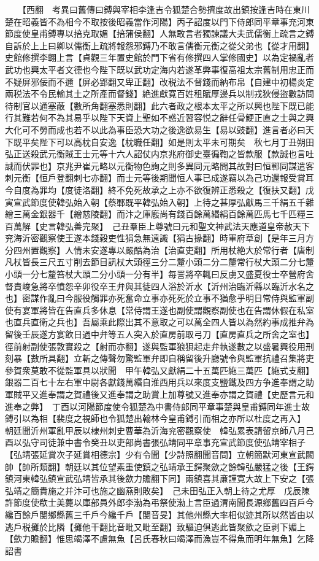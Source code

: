 　　【西翻　考異曰舊傳曰鎛與宰相李逢吉令狐楚合勢擠度故出鎮按逢吉時在東川楚在昭義皆不為相今不取按後昭義當作河陽】丙子詔度以門下侍郎同平章事充河東節度使皇甫鎛專以掊克取媚【掊蒲侯翻】人無敢言者獨諫議大夫武儒衡上疏言之鎛自訴於上上曰卿以儒衡上疏將報怨邪鎛乃不敢言儒衡元衡之從父弟也【從才用翻】　史館修撰李翺上言【貞觀三年置史館於門下省有修撰四人掌修國史】以為定禍亂者武功也興太平者文德也今陛下既以武功定海内若遂革弊事復高祖太宗舊制用忠正而不疑屏邪佞而不邇【屏必郢翻又卑正翻】改税法不督錢而納布帛【自建中初楊炎定兩税法不令民輸其土之所產而督錢】絶進獻寛百姓租賦厚邊兵以制戎狄侵盜數訪問待制官以通塞蔽【數所角翻塞悉則翻】此六者政之根本太平之所以興也陛下既已能行其難若何不為其易乎以陛下天資上聖如不惑近習容悦之辭任骨鯁正直之士與之興大化可不勞而成也若不以此為事臣恐大功之後逸欲易生【易以豉翻】進言者必曰天下既平矣陛下可以高枕自安逸【枕職任翻】如是則太平未可期矣　秋七月丁丑朔田弘正送殺武元衡賊王士元等十六人詔仗内京兆府御史臺徧鞫之皆款服【款誠也言吐誠而伏罪也】京兆尹崔元略以元衡物色詢之則多異同元略問其故對曰恒鄆同謀遣客刺元衡【恒戶登翻刺七亦翻】而士元等後期聞恒人事已成遂竊以為己功還報受賞耳今自度為罪均【度徒洛翻】終不免死故承之上亦不欲復辨正悉殺之【復扶又翻】戊寅宣武節度使韓弘始入朝【蔡鄆既平韓弘始入朝】上待之甚厚弘獻馬三千絹五千雜繒三萬金銀器千【繒慈陵翻】而汴之庫廏尚有錢百餘萬緡絹百餘萬匹馬七千匹糧三百萬解【史言韓弘善完聚】　己丑羣臣上尊號曰元和聖文神武法天應道皇帝赦天下兖海沂密觀察使王遂本錢穀吏性狷急無遠識【狷古掾翻】時軍府草創【是年三月方分四州置觀察】人情未安遂專以嚴酷為治【治直吏翻】所用杖絶大於常行者【唐制凡杖皆長三尺五寸削去節目訊杖大頭徑三分二釐小頭二分二釐常行杖大頭二分七釐小頭一分七釐笞杖大頭二分小頭一分有半】每詈將卒輒曰反虜又盛夏役士卒營府舍督責峻急將卒憤怨辛卯役卒王弁與其徒四人浴於沂水【沂州治臨沂縣以臨沂水名之也】密謀作亂曰今服役觸罪亦死奮命立事亦死死於立事不猶愈乎明日常侍與監軍副使有宴軍將皆在告直兵多休息【常侍謂王遂也副使謂觀察副使也在告謂休假在私室也直兵直衛之兵也】吾屬乘此際出其不意取之可以萬全四人皆以為然約事成推弁為留後壬辰遂方宴飲日過中弁等五人突入於直房前取弓刀【直房直兵之所舍之室也】徑前射副使張敦實殺之【射而亦翻】遂與監軍狼狽起走弁執遂數之以盛暑興役用刑刻暴【數所具翻】立斬之傳聲勿驚監軍弁即自稱留後升廳號令與監軍抗禮召集將吏參賀衆莫敢不從監軍具以狀聞　甲午韓弘又獻絹二十五萬匹絁三萬匹【絁式支翻】銀器二百七十左右軍中尉各獻錢萬緡自淮西用兵以來度支鹽鐵及四方争進奉謂之助軍賊平又進奉謂之賀禮後又進奉謂之助賞上加尊號又進奉亦謂之賀禮【史歷言元和進奉之弊】　丁酉以河陽節度使令狐楚為中書侍郎同平章事楚與皇甫鎛同年進士故鎛引以為相【裴度之視師也令狐楚出翰林今皇甫鎛引而相之亦所以杜度之再入】　朝廷聞沂州軍亂甲辰以棣州刺史曹華為沂海兖密觀察使　韓弘累表請留京師八月己酉以弘守司徒兼中書令癸丑以吏部尚書張弘靖同平章事充宣武節度使弘靖宰相子【弘靖張延賞次子延賞相德宗】少有令聞【少詩照翻聞音問】立朝簡默河東宣武闕帥【帥所類翻】朝廷以其位望素重使鎮之弘靖承王鍔聚歛之餘韓弘嚴猛之後【王鍔鎮河東韓弘鎮宣武弘靖皆承其後歛力贍翻下同】兩鎮喜其亷謹寛大故上下安之【張弘靖之簡貴施之并汴可也施之幽燕則敗矣】　己未田弘正入朝上待之尤厚　戊辰陳許節度使欷士美薨以庫部員外郎李渤為弔祭使渤上言臣過渭南聞長源鄉舊四百戶今纔百餘戶閺鄉縣舊三千戶今纔千戶【閺音旻】其他州縣大率相似迹其所以然皆由以逃戶税攤於比隣【攤他干翻比音毗又毗至翻】致驅迫俱逃此皆聚歛之臣剥下媚上【歛力贍翻】惟思竭澤不慮無魚【呂氏春秋曰竭澤而漁豈不得魚而明年無魚】乞降詔書